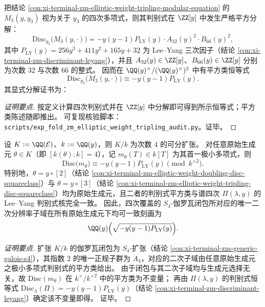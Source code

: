 \begin{conclusion}\label{con:xi-terminal-zm-elliptic-weight-tripling-disc-squareclass}
把结论 \ref{con:xi-terminal-zm-elliptic-weight-tripling-modular-equation} 的 \(M_{3}(y,y_{3})\) 视为关于 \(y_{3}\) 的四次多项式，则其判别式在 \(\ZZ[y]\) 中发生严格平方分解：
\[
\mathrm{Disc}_{y_{3}}\bigl(M_{3}(y,\cdot)\bigr)
=-y(y-1)P_{\mathrm{LY}}(y)\cdot A_{32}(y)^{2}\cdot B_{66}(y)^{2},
\]
其中 \(P_{\mathrm{LY}}(y)=256y^{3}+411y^{2}+165y+32\) 为 Lee--Yang 三次因子（结论 \ref{con:xi-terminal-zm-discriminant-leyang}），并且 \(A_{32}(y)\in\ZZ[y]\)、\(B_{66}(y)\in\ZZ[y]\) 分别为次数 \(32\) 与次数 \(66\) 的整式。
因而在 \(\QQ(y)^{\times}/(\QQ(y)^{\times})^{2}\) 中有平方类恒等式
\[
\mathrm{Disc}_{y_{3}}\bigl(M_{3}(y,\cdot)\bigr)\equiv -y(y-1)P_{\mathrm{LY}}(y).
\]
其显式分解证书为：

\end{conclusion}
\begin{proof}[证明要点]
按定义计算四次判别式并在 \(\ZZ[y]\) 中分解即可得到所示恒等式；平方类陈述随即推出。
可复现核验脚本：\texttt{scripts/exp\_fold\_zm\_elliptic\_weight\_tripling\_audit.py}。证毕。
\end{proof}

\begin{conclusion}\label{con:xi-terminal-zm-elliptic-primitive-generator-discriminant-squareclass}
设 \(K:=\QQ(\mathcal{E})\)、\(k:=\QQ(y)\)，则 \(K/k\) 为次数 \(4\) 的可分扩张。
对任意原始生成元 \(\theta\in K\)（即 \([k(\theta):k]=4\)），记 \(m_{\theta}(T)\in k[T]\) 为其首一极小多项式，则
\[
\mathrm{Disc}\bigl(m_{\theta}\bigr)\equiv -y(y-1)P_{\mathrm{LY}}(y)\pmod{k^{\times 2}}.
\]
特别地，\(\theta=y\circ[2]\)（结论 \ref{con:xi-terminal-zm-elliptic-weight-doubling-disc-squareclass}）与 \(\theta=y\circ[3]\)（结论 \ref{con:xi-terminal-zm-elliptic-weight-tripling-disc-squareclass}）均为原始生成元，且二者的判别式平方类与谱四次 \(\Pi(\lambda,y)\) 的 Lee--Yang 判别式核完全一致。
因此，四次覆盖的 \(S_{4}\)-伽罗瓦闭包所对应的唯一二次分辨率子域在所有原始生成元下均可一致刻画为
\[
\QQ(y)\Bigl(\sqrt{-y(y-1)P_{\mathrm{LY}}(y)}\Bigr).
\]
\end{conclusion}
\begin{proof}[证明要点]
扩张 \(K/k\) 的伽罗瓦闭包为 \(S_{4}\)-扩张（结论 \ref{con:xi-terminal-zm-generic-galois-s4}），其指数 \(2\) 的唯一正规子群为 \(A_{4}\)，对应的二次子域由任意原始生成元之极小多项式判别式的平方类给出。
由于闭包与其二次子域均与生成元选择无关，故 \(\mathrm{Disc}(m_{\theta})\) 在 \(k^{\times}/k^{\times 2}\) 中的平方类为不变量；
再由 \(\Pi(\lambda,y)\) 的判别式恒等式 \(\mathrm{Disc}_{\lambda}(\Pi)=-y(y-1)P_{\mathrm{LY}}(y)\)（结论 \ref{con:xi-terminal-zm-discriminant-leyang}）确定该不变量即得。
证毕。
\end{proof}

